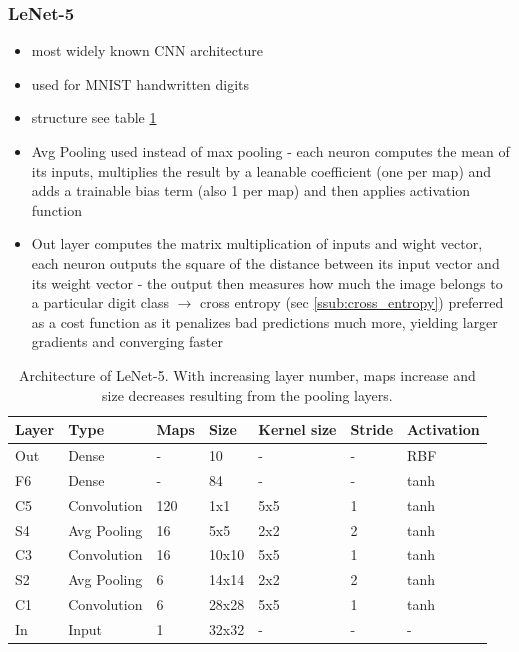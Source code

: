 \documentclass[12pt,a4paper]{article}
\begin{document}
\subsubsection{LeNet-5} %
\label{ssub:lenet_5}
\begin{itemize}
  \item most widely known CNN architecture
  \item used for MNIST handwritten digits
  \item structure see table \ref{tab:lenet5}
  \item Avg Pooling used instead of max pooling - each neuron computes the mean of its inputs, multiplies the result by a leanable coefficient (one per map) and adds a trainable bias term (also 1 per map) and then applies activation function
  \item Out layer computes the matrix multiplication of inputs and wight vector, each neuron outputs the square of the distance between its input vector and its weight vector - the output then measures how much the image belongs to a particular digit class
  \newline \indent $\longrightarrow$ cross entropy (sec \ref{ssub:cross_entropy}) preferred as a cost function as it penalizes bad predictions much more, yielding larger gradients and converging faster
\end{itemize}

\begin{table}
  \centering
    \begin{tabular}{|l|l|l|l|l|l|l|}
      \hline
      Layer &Type  &Maps  &Size  &Kernel size  &Stride  &Activation  \\
      \hline
      Out &Dense & - & 10 & - & - & RBF \\
      F6 & Dense &- &84 & - &- &tanh \\
      C5 & Convolution & 120 & 1x1 & 5x5 & 1 & tanh \\
      S4 & Avg Pooling & 16 & 5x5 & 2x2 & 2 & tanh \\
      C3 & Convolution & 16 & 10x10 & 5x5 & 1 & tanh \\
      S2 & Avg Pooling & 6 & 14x14 & 2x2 & 2 & tanh \\
      C1 & Convolution & 6 & 28x28 & 5x5 & 1 & tanh \\
      In & Input & 1 & 32x32 & - &- &-\\  
      \hline
    \end{tabular}
  \caption[Architecture of LeNet-5]{Architecture of LeNet-5. With increasing layer number, maps increase and size decreases resulting from the pooling layers.}
  \label{tab:lenet5}
\end{table}
\end{document}
